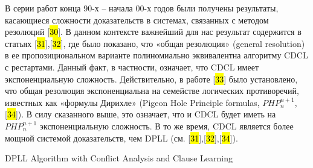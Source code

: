В серии работ конца 90-х -- начала 00-х годов были получены результаты, касающиеся сложности доказательств в системах, связанных с методом резолюций {[}\hl{30}{]}. В данном контексте важнейший для нас результат содержится в статьях {[}\hl{31}{]},{[}\hl{32}{]}, где было показано, что «общая резолюция» (general resolution) в ее пропозициональном варианте полиномиально эквивалентна алгоритму CDCL с рестартами. Данный факт, в частности, означает, что CDCL имеет экспоненциальную сложность. Действительно, в работе {[}\hl{33}{]} было установлено, что общая резолюция экспоненциальна на семействе логических противоречий, известных как «формулы Дирихле» (Pigeon Hole Principle formulas, $PHP_{n}^{n + 1}$, {[}\hl{34}{]}). В силу сказанного выше, это означает, что и CDCL будет иметь на $PHP_{n}^{n + 1}$ экспоненциальную сложность. В то же время, CDCL является более мощной системой доказательств, чем DPLL (см. {[}\hl{31}{]},{[}\hl{32}{]},{[}\hl{34}{]}).




\begin{algorithm}[H]
    \caption{DPLL Algorithm with Conflict Analysis and Clause Learning}
    \DontPrintSemicolon


\end{algorithm}


